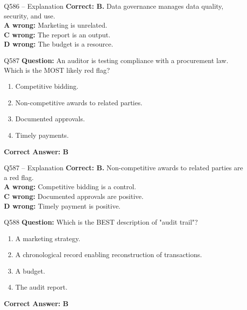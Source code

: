 \documentclass[aspectratio=169,10pt]{beamer}
\begin{document}
	\begin{frame}[t]{Q586 -- Explanation}
		\small
		\textbf{Correct: B.} Data governance manages data quality, security, and use. \\[4pt]
		\textbf{A wrong:} Marketing is unrelated. \\[2pt]
		\textbf{C wrong:} The report is an output. \\[2pt]
		\textbf{D wrong:} The budget is a resource.
	\end{frame}
	
	\begin{frame}[t]{Q587}
		\small
		\textbf{Question:} An auditor is testing compliance with a procurement law. Which is the MOST likely red flag?
		\begin{enumerate}[label=\Alph*.,itemsep=1pt,topsep=2pt]
			\item Competitive bidding.
			\item Non-competitive awards to related parties.
			\item Documented approvals.
			\item Timely payments.
		\end{enumerate}
		\vspace{4pt}
		\textbf{Correct Answer: B}
	\end{frame}
	
	\begin{frame}[t]{Q587 -- Explanation}
		\small
		\textbf{Correct: B.} Non-competitive awards to related parties are a red flag. \\[4pt]
		\textbf{A wrong:} Competitive bidding is a control. \\[2pt]
		\textbf{C wrong:} Documented approvals are positive. \\[2pt]
		\textbf{D wrong:} Timely payment is positive.
	\end{frame}
	
	\begin{frame}[t]{Q588}
		\small
		\textbf{Question:} Which is the BEST description of "audit trail"?
		\begin{enumerate}[label=\Alph*.,itemsep=1pt,topsep=2pt]
			\item A marketing strategy.
			\item A chronological record enabling reconstruction of transactions.
			\item A budget.
			\item The audit report.
		\end{enumerate}
		\vspace{4pt}
		\textbf{Correct Answer: B}
	\end{frame}
	
\end{document}
